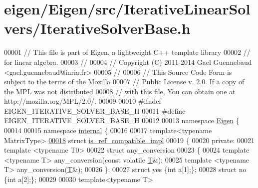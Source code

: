 \hypertarget{eigen_2_eigen_2src_2_iterative_linear_solvers_2_iterative_solver_base_8h_source}{}\section{eigen/\+Eigen/src/\+Iterative\+Linear\+Solvers/\+Iterative\+Solver\+Base.h}
\label{eigen_2_eigen_2src_2_iterative_linear_solvers_2_iterative_solver_base_8h_source}

\begin{DoxyCode}
00001 \textcolor{comment}{// This file is part of Eigen, a lightweight C++ template library}
00002 \textcolor{comment}{// for linear algebra.}
00003 \textcolor{comment}{//}
00004 \textcolor{comment}{// Copyright (C) 2011-2014 Gael Guennebaud <gael.guennebaud@inria.fr>}
00005 \textcolor{comment}{//}
00006 \textcolor{comment}{// This Source Code Form is subject to the terms of the Mozilla}
00007 \textcolor{comment}{// Public License v. 2.0. If a copy of the MPL was not distributed}
00008 \textcolor{comment}{// with this file, You can obtain one at http://mozilla.org/MPL/2.0/.}
00009 
00010 \textcolor{preprocessor}{#ifndef EIGEN\_ITERATIVE\_SOLVER\_BASE\_H}
00011 \textcolor{preprocessor}{#define EIGEN\_ITERATIVE\_SOLVER\_BASE\_H}
00012 
00013 \textcolor{keyword}{namespace }\hyperlink{namespace_eigen}{Eigen} \{ 
00014 
00015 \textcolor{keyword}{namespace }\hyperlink{namespaceinternal}{internal} \{
00016 
00017 \textcolor{keyword}{template}<\textcolor{keyword}{typename} MatrixType>
\hyperlink{struct_eigen_1_1internal_1_1is__ref__compatible__impl}{00018} \textcolor{keyword}{struct }\hyperlink{struct_eigen_1_1internal_1_1is__ref__compatible__impl}{is\_ref\_compatible\_impl}
00019 \{
00020 \textcolor{keyword}{private}:
00021   \textcolor{keyword}{template} <\textcolor{keyword}{typename} T0>
00022   \textcolor{keyword}{struct }any\_conversion
00023   \{
00024     \textcolor{keyword}{template} <\textcolor{keyword}{typename} T> any\_conversion(\textcolor{keyword}{const} \textcolor{keyword}{volatile} \hyperlink{group___sparse_core___module}{T}&);
00025     \textcolor{keyword}{template} <\textcolor{keyword}{typename} T> any\_conversion(\hyperlink{group___sparse_core___module}{T}&);
00026   \};
00027   \textcolor{keyword}{struct }yes \{\textcolor{keywordtype}{int} a[1];\};
00028   \textcolor{keyword}{struct }no  \{\textcolor{keywordtype}{int} a[2];\};
00029 
00030   \textcolor{keyword}{template}<\textcolor{keyword}{typename} T>

\end{DoxyCode}
